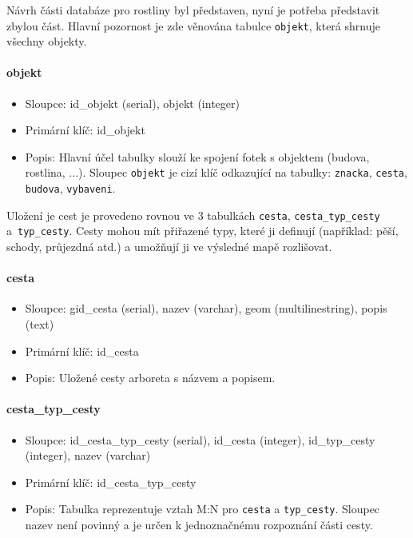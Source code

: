 \documentclass[12pt]{article}%
\begin{document}
{{%
Návrh části databáze pro rostliny byl představen, nyní je potřeba představit zbylou část. Hlavní pozornost
je zde věnována tabulce \texttt{objekt}, která shrnuje všechny objekty. 
\paragraph{objekt}
\begin{itemize}
\item Sloupce: id\_objekt (serial), objekt (integer)
\item Primární klíč: id\_objekt
\item Popis: Hlavní účel tabulky slouží ke spojení fotek s objektem (budova, rostlina, ...). 
Sloupec \texttt{objekt} je cizí klíč odkazující na tabulky: \texttt{znacka}, \texttt{cesta}, 
\texttt{budova}, \texttt{vybaveni}. 
\end{itemize}

Uložení je cest je provedeno rovnou ve 3 tabulkách \texttt{cesta}, \texttt{cesta\_typ\_cesty} 
a~\texttt{typ\_cesty}. Cesty mohou mít přiřazené typy, které ji definují (například: pěší, schody, průjezdná atd.)
a umožňují ji ve výsledné mapě rozlišovat.
\paragraph{cesta}
\begin{itemize}
\item Sloupce: gid\_cesta (serial), nazev (varchar), geom (multilinestring), popis (text)
\item Primární klíč: id\_cesta
\item Popis: Uložené cesty arboreta s názvem a popisem.
\end{itemize}

\paragraph{cesta\_typ\_cesty}
\begin{itemize}
\item Sloupce: id\_cesta\_typ\_cesty (serial), id\_cesta (integer), id\_typ\_cesty (integer), 
nazev (varchar)
\item Primární klíč: id\_cesta\_typ\_cesty
\item Popis: Tabulka reprezentuje vztah M:N pro \texttt{cesta} a \texttt{typ\_cesty}. 
Sloupec nazev není povinný a je určen k jednoznačnému rozpoznání části cesty.
\end{itemize}

}}
\end{document}
